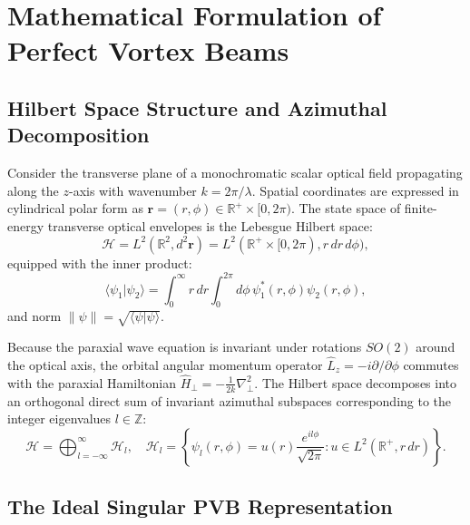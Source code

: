 \documentclass{optica-article}
\begin{document}
\section{Mathematical Formulation of Perfect Vortex Beams}
\label{sec:formulation}

\subsection{Hilbert Space Structure and Azimuthal Decomposition}

Consider the transverse plane of a monochromatic scalar optical field propagating along the $z$-axis with wavenumber $k = 2\pi / \lambda$. Spatial coordinates are expressed in cylindrical polar form as $\mathbf{r} = (r, \phi) \in \mathbb{R}^+ \times [0, 2\pi)$. The state space of finite-energy transverse optical envelopes is the Lebesgue Hilbert space:
\begin{equation}
\mathcal{H} = L^2(\mathbb{R}^2, d^2\mathbf{r}) = L^2(\mathbb{R}^+ \times [0, 2\pi), r \, dr \, d\phi),
\end{equation}
equipped with the inner product:
\begin{equation}
\langle \psi_1 | \psi_2 \rangle = \int_0^\infty r \, dr \int_0^{2\pi} d\phi \, \psi_1^*(r, \phi) \psi_2(r, \phi),
\label{eq:inner_product_def}
\end{equation}
and norm $\|\psi\| = \sqrt{\langle \psi | \psi \rangle}$.

Because the paraxial wave equation is invariant under rotations $SO(2)$ around the optical axis, the orbital angular momentum operator $\hat{L}_z = -i \partial / \partial \phi$ commutes with the paraxial Hamiltonian $\hat{H}_\perp = -\frac{1}{2k} \nabla_\perp^2$. The Hilbert space decomposes into an orthogonal direct sum of invariant azimuthal subspaces corresponding to the integer eigenvalues $l \in \mathbb{Z}$:
\begin{equation}
\mathcal{H} = \bigoplus_{l=-\infty}^\infty \mathcal{H}_l, \quad \mathcal{H}_l = \left\{ \psi_l(r, \phi) = u(r) \frac{e^{i l \phi}}{\sqrt{2\pi}} : u \in L^2(\mathbb{R}^+, r \, dr) \right\}.
\end{equation}

\subsection{The Ideal Singular PVB Representation}
\end{document}
